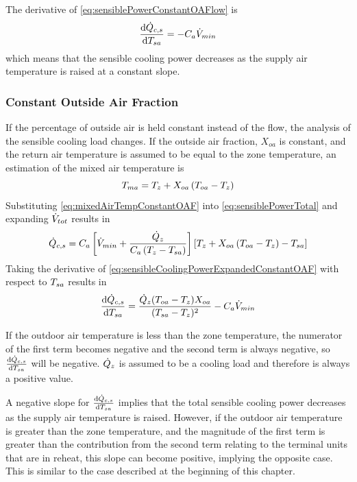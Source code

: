 The derivative of  \ref{eq:sensiblePowerConstantOAFlow} is
\begin{equation}
    \dv{\dot{Q}_{c,s}}{T_{sa}{}} = -C_{a} \dot{V}_{min} 
\end{equation}
which means that the sensible cooling power decreases as the supply air
temperature is raised at a constant slope. 


\subsubsection{Constant Outside Air Fraction}

If the percentage of outside air is held constant instead of the flow,
the analysis of the sensible cooling load changes. If the outside air
fraction, \(X_{oa}\) is constant, and the return air temperature is assumed to be
equal to the zone temperature, an estimation of the mixed air temperature is
\begin{equation}\label{eq:mixedAirTempConstantOAF}
    T_{ma}{} = T_{z} + X_{oa} \left(T_{oa}{} - T_{z}\right)
\end{equation}
Substituting  \ref{eq:mixedAirTempConstantOAF} into
\ref{eq:sensiblePowerTotal} and expanding \(\dot{V}_{tot}\) results in
\begin{equation}\label{eq:sensibleCoolingPowerExpandedConstantOAF}
    \dot{Q}_{c,s} = C_{a} \left[ \dot{V}_{min} + \frac{\dot{Q}_{z}}{C_{a}\left(T_{z}-T_{sa}{}\right)}{} \right] \left[ T_{z} + X_{oa} \left(T_{oa}{} - T_{z}\right) - T_{sa}{}  \right]
\end{equation}
Taking the derivative of 
\ref{eq:sensibleCoolingPowerExpandedConstantOAF} with respect to
\(T_{sa}{}\) results in
\begin{equation}\label{eq:firstDerivativeSensible}
    \dv{\dot{Q}_{c,s}}{T_{sa}{}} = \frac{\dot{Q}_{z} (T_{oa}{}-T_{z})
    X_{oa}}{(T_{sa}{}-T_{z})^2}-C_{a} \dot{V}_{min}
\end{equation}

If the outdoor air temperature is less than the zone temperature, the
numerator of the first term becomes negative and the second term is
always negative, so \(\dv{\dot{Q}_{c,s}}{T_{sa}{}}\) will be negative.
\(\dot{Q}_{z}\) is assumed to be a cooling load and therefore is
always a positive value. 

A negative slope for \(\dv{\dot{Q}_{c,s}}{T_{sa}{}}\) implies that the
total sensible cooling power decreases as the supply air temperature is
raised. However, if the outdoor air temperature is greater than the zone
temperature, and the magnitude of the first term is greater than the
contribution from the second term relating to the terminal units that
are in reheat, this slope can become positive, implying the opposite
case. This is similar to the case described at the beginning of this
chapter. 

